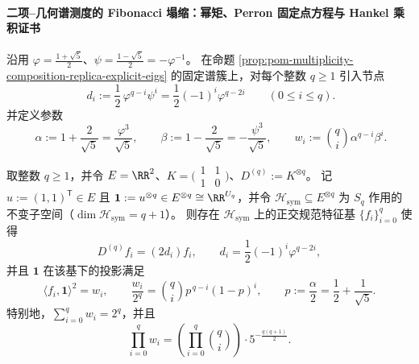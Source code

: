 \paragraph{二项--几何谱测度的 Fibonacci 塌缩：幂矩、Perron 固定点方程与 Hankel 乘积证书}\label{par:pom-replica-softcore-fibonacci-moment-collapse}
沿用 \( \varphi=\frac{1+\sqrt5}{2} \)、\(\psi=\frac{1-\sqrt5}{2}=-\varphi^{-1}\)。
在命题 \ref{prop:pom-multiplicity-composition-replica-explicit-eigs} 的固定谱簇上，对每个整数 \(q\ge 1\) 引入节点
\begin{equation}\label{eq:pom-replica-softcore-di-nodes}
\boxed{\;
d_i:=\frac12\,\varphi^{q-i}\psi^i=\frac12(-1)^i\varphi^{q-2i}\qquad(0\le i\le q).}
\end{equation}
并定义参数
\begin{equation}\label{eq:pom-replica-softcore-alpha-beta}
\boxed{\;
\alpha:=1+\frac{2}{\sqrt5}=\frac{\varphi^3}{\sqrt5},\qquad
\beta:=1-\frac{2}{\sqrt5}=-\frac{\psi^3}{\sqrt5},\qquad
w_i:=\binom{q}{i}\alpha^{q-i}\beta^i.}
\end{equation}

\begin{proposition}\label{prop:pom-replica-softcore-sym-eigenbasis-binomial-weights}
取整数 \(q\ge 1\)，并令 \(E=\RR^2\)、\(K=\bigl(\begin{smallmatrix}1&1\\[2pt]1&0\end{smallmatrix}\bigr)\)、\(D^{(q)}:=K^{\otimes q}\)。
记 \(u:=(1,1)^{\mathsf T}\in E\) 且 \(\mathbf{1}:=u^{\otimes q}\in E^{\otimes q}\cong \RR^{U_q}\)，并令 \(\mathcal H_{\mathrm{sym}}\subseteq E^{\otimes q}\) 为 \(S_q\) 作用的不变子空间（\(\dim\mathcal H_{\mathrm{sym}}=q+1\)）。
则存在 \(\mathcal H_{\mathrm{sym}}\) 上的正交规范特征基 \(\{f_i\}_{i=0}^{q}\) 使得
\[
D^{(q)}f_i=(2d_i)f_i,
\qquad
d_i=\frac12(-1)^i\varphi^{q-2i},
\]
并且 \(\mathbf{1}\) 在该基下的投影满足
\[
\langle f_i,\mathbf{1}\rangle^2=w_i,
\qquad
\frac{w_i}{2^q}=\binom{q}{i}p^{\,q-i}(1-p)^i,
\qquad
p:=\frac{\alpha}{2}=\frac12+\frac{1}{\sqrt5}.
\]
特别地，\(\sum_{i=0}^q w_i=2^q\)，并且
\[
\prod_{i=0}^{q}w_i
=
\left(\prod_{i=0}^{q}\binom{q}{i}\right)\cdot 5^{-\frac{q(q+1)}{2}}.
\]
\end{proposition}

